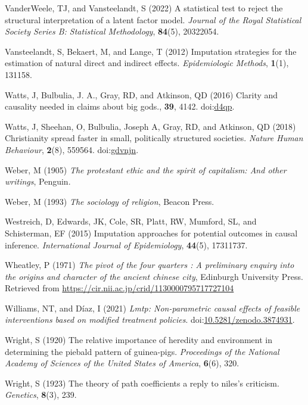 \documentclass[
  singlecolumn,
  9pt]{article}
\begin{document}
\begin{CSLReferences}
VanderWeele, TJ, and Vansteelandt, S (2022) A statistical test to reject
the structural interpretation of a latent factor model. \emph{Journal of
the Royal Statistical Society Series B: Statistical Methodology},
\textbf{84}(5), 20322054.

Vansteelandt, S, Bekaert, M, and Lange, T (2012) Imputation strategies
for the estimation of natural direct and indirect effects.
\emph{Epidemiologic Methods}, \textbf{1}(1), 131158.

Watts, J, Bulbulia, J. A., Gray, RD, and Atkinson, QD (2016) Clarity and
causality needed in claims about big gods., \textbf{39}, 4142.
doi:\href{https://doi.org/d4qp}{d4qp}.

Watts, J, Sheehan, O, Bulbulia, Joseph A, Gray, RD, and Atkinson, QD
(2018) Christianity spread faster in small, politically structured
societies. \emph{Nature Human Behaviour}, \textbf{2}(8), 559564.
doi:\href{https://doi.org/gdvnjn}{gdvnjn}.

Weber, M (1905) \emph{The protestant ethic and the spirit of capitalism:
And other writings}, Penguin.

Weber, M (1993) \emph{The sociology of religion}, Beacon Press.

Westreich, D, Edwards, JK, Cole, SR, Platt, RW, Mumford, SL, and
Schisterman, EF (2015) Imputation approaches for potential outcomes in
causal inference. \emph{International Journal of Epidemiology},
\textbf{44}(5), 17311737.

Wheatley, P (1971) \emph{The pivot of the four quarters : A preliminary
enquiry into the origins and character of the ancient chinese city},
Edinburgh University Press. Retrieved from
\url{https://cir.nii.ac.jp/crid/1130000795717727104}

Williams, NT, and Díaz, I (2021) \emph{Lmtp: Non-parametric causal
effects of feasible interventions based on modified treatment policies}.
doi:\href{https://doi.org/10.5281/zenodo.3874931}{10.5281/zenodo.3874931}.

Wright, S (1920) The relative importance of heredity and environment in
determining the piebald pattern of guinea-pigs. \emph{Proceedings of the
National Academy of Sciences of the United States of America},
\textbf{6}(6), 320.

Wright, S (1923) The theory of path coefficients a reply to niles's
criticism. \emph{Genetics}, \textbf{8}(3), 239.

\end{CSLReferences}
\end{document}
